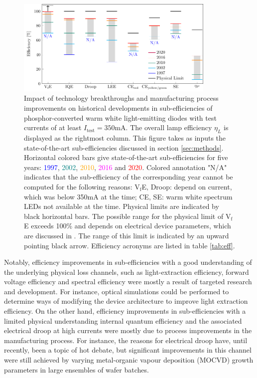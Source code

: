 \documentclass[a4paper,nocompress]{spie}  %
\begin{document}
    \begin{figure} [ht]
        \begin{center}
            \includegraphics[width=0.85\textwidth]{SPIE/article/breakthroughs_efficiency.pdf}
        \end{center}
        \caption{Impact of technology breakthroughs and manufacturing process improvements on historical developments in sub-efficiencies of phosphor-converted warm white light-emitting diodes with test currents of at least $I_\text{test}=350$mA. The overall lamp efficiency $\eta_L$ is displayed as the rightmost column. This figure takes as inputs the state-of-the-art sub-efficiencies discussed in section \ref{sec:methods}. Horizontal colored bars give state-of-the-art sub-efficiencies for five years: \textcolor{blue}{1997}, \textcolor{teal}{2002}, \textcolor{orange}{2010}, \textcolor{magenta}{2016} and \textcolor{red}{2020}. Colored annotation "N/A" indicates that the sub-efficiency of the corresponding year cannot be computed for the following reasons: V$_\text{f}$E, Droop: depend on current, which was below 350mA at the time; CE, SE: warm white spectrum LEDs not available at the time. Physical limits are indicated by black horizontal bars. The possible range for the physical limit of V$_\text{f}$E exceeds 100\% and depends on electrical device parameters, which are discussed in \cite{david2016electrical}. The range of this limit is indicated by an upward pointing black arrow. Efficiency acronyms are listed in table \ref{tab:eff}.}
        \label{fig:efficiency}
    \end{figure}
    
    Notably, efficiency improvements in sub-efficiencies with a good understanding of the underlying physical loss channels, such as light-extraction efficiency, forward voltage efficiency and spectral efficiency were mostly a result of targeted research and development. For instance, optical simulations could be performed to determine ways of modifying the device architecture to improve light extraction efficiency. On the other hand, efficiency improvements in sub-efficiencies with a limited physical understanding internal quantum efficiency and the associated electrical droop at high currents were mostly due to process improvements in the manufacturing process. For instance, the reasons for electrical droop have, until recently, been a topic of hot debate, but significant improvements in this channel were still achieved by varying metal-organic vapour deposition (MOCVD) growth parameters in large ensembles of wafer batches.
\end{document}
